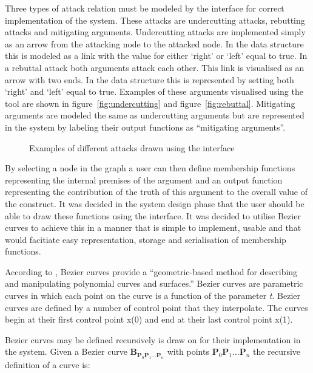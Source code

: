 Three types of attack relation must be modeled by the interface for correct implementation of the system. These attacks are undercutting attacks, rebutting attacks and mitigating arguments. Undercutting attacks are implemented simply as an arrow from the attacking node to the attacked node. In the data structure this is modeled as a link with the value for either `right' or `left' equal to true. In a rebuttal attack both arguments attack each other. This link is visualised as an arrow with two ends. In the data structure this is represented by setting both `right' and `left' equal to true. Examples of these arguments visualised using the tool are shown in figure~\ref{fig:undercutting} and figure~\ref{fig:rebuttal}. Mitigating arguments are modeled the same as undercutting arguments but are represented in the system by labeling their output functions as ``mitigating arguments''.

\begin{figure}
\hfill
{}\hfill
\caption{Examples of different attacks drawn using the interface}
\end{figure}

By selecting a node in the graph a user can then define membership functions representing the internal premises of the argument and an output function representing the contribution of the truth of this argument to the overall value of the construct. It was decided in the system design phase that the user should be able to draw these functions using the interface. It was decided to utilise Bezier curves to achieve this in a manner that is simple to implement, usable and that would facitiate easy representation, storage and serialisation of membership functions. 

According to \cite{farin2002handbook}, Bezier curves provide a ``geometric-based method for describing and manipulating polynomial curves and surfaces.'' Bezier curves are parametric curves in which each point on the curve is a function of the parameter \textit{t}. Bezier curves are defined by a number of control point that they interpolate. The curves begin at their first control point x(0) and end at their last control point x(1).

Bezier curves may be defined recursively is draw on for their implementation in the system. Given a Bezier curve $\mathbf{B}_{\mathbf{P}_0\mathbf{P}_1\ldots\mathbf{P}_n}$ with points $\mathbf{P}_0\mathbf{P}_1\ldots\mathbf{P}_n$ the recursive definition of a curve is:

